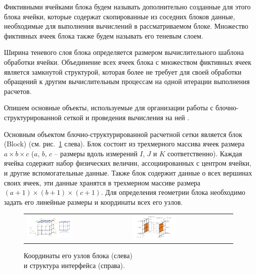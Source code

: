 \begin{definition}
Фиктивными ячейками блока будем называть дополнительно созданные для этого блока ячейки, которые содержат скопированные из соседних блоков данные, необходимые для выполнения вычислений в рассматриваемом блоке.
Множество фиктивных ячеек блока также будем называть его теневым слоем.
\end{definition}

Ширина теневого слоя блока определяется размером вычислительного шаблона обработки ячейки.
Объединение всех ячеек блока с множеством фиктивных ячеек является замкнутой структурой, которая более не требует для своей обработки обращений к другим вычислительным процессам на одной итерации выполнения расчетов.

Опишем основные объекты, используемые для организации работы с блочно-структурированной сеткой и проведения вычисления на ней \cite{CertRybakov2020PrepStruct}.

Основным объектом блочно-структурированной расчетной сетки является блок (Block) (см. рис.~\ref{fig:par_block_and_iface} слева). 
Блок состоит из трехмерного массива ячеек размера $a \times b \times c$ ($a$, $b$, $c$ -- размеры вдоль измерений $I$, $J$ и $K$ соответственно).
Каждая ячейка содержит набор физических величин, ассоциированных с центром ячейки, и другие вспомогательные данные.
Также блок содержит данные о всех вершинах своих ячеек, эти данные хранятся в трехмерном массиве размера $(a + 1) \times (b + 1) \times (c + 1)$.
Для определения геометрии блока необходимо задать его линейные размеры и координаты всех его узлов.

\begin{figure}[ht]
\centering
\begin{tabular}{ll}
\includegraphics[width=0.45\textwidth]{fig/par_block_coords.pdf}
&
\includegraphics[width=0.45\textwidth]{fig/par_7-iface.pdf}
\end{tabular}
\singlespacing
{}\caption{Координаты его узлов блока (слева) \\ и структура интерфейса (справа).}
\label{fig:par_block_and_iface}
\end{figure}

